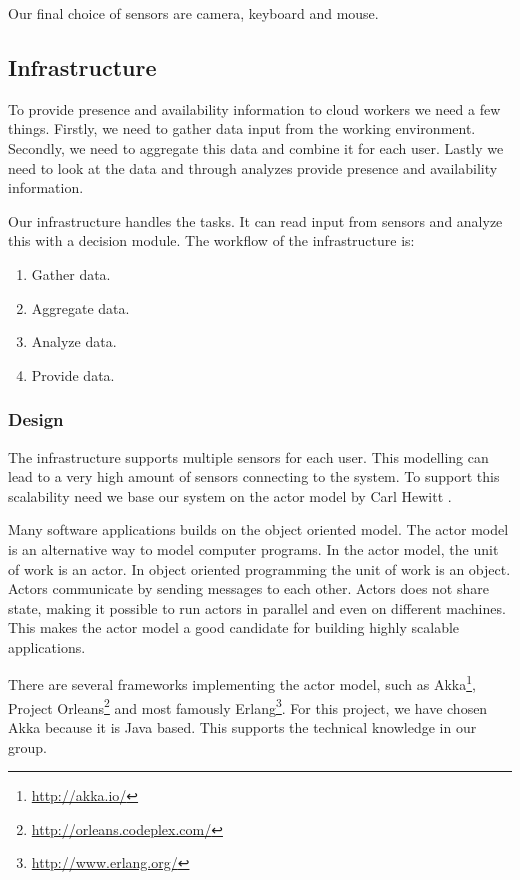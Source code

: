 \documentclass{sigchi}
\begin{document}
Our final choice of sensors are camera, keyboard and mouse.

\subsection{Infrastructure}
To provide presence and availability information to cloud workers we need a few things.
Firstly, we need to gather data input from the working environment.
Secondly, we need to aggregate this data and combine it for each user. Lastly we need to look at the data and through analyzes provide presence and availability information.

Our infrastructure handles the tasks. It can read input from sensors and analyze this with a decision module.
The workflow of the infrastructure is:

\begin{enumerate}[noitemsep]
  \item Gather data.
  \item Aggregate data.
  \item Analyze data.
  \item Provide data.
\end{enumerate}

\subsubsection{Design}
The infrastructure supports multiple sensors for each user.
This modelling can lead to a very high amount of sensors connecting to the system.
To support this scalability need we base our system on the actor model by Carl Hewitt \cite{hewitt1973universal}.

Many software applications builds on the object oriented model.
The actor model is an alternative way to model computer programs.
In the actor model, the unit of work is an actor.
In object oriented programming the unit of work is an object.
Actors communicate by sending messages to each other.
Actors does not share state, making it possible to run actors in parallel and even on different machines.
This makes the actor model a good candidate for building highly scalable applications.

There are several frameworks implementing the actor model, such as Akka\footnote{\url{http://akka.io/}}, Project Orleans\footnote{\url{http://orleans.codeplex.com/}} and most famously Erlang\footnote{\url{http://www.erlang.org/}}.
For this project, we have chosen Akka because it is Java based.
This supports the technical knowledge in our group.
\end{document}
